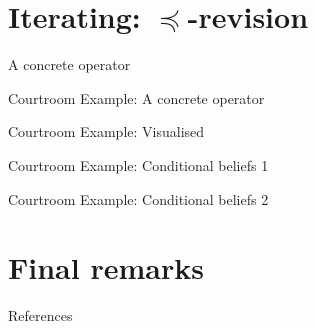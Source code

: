 \documentclass[11pt]{beamer}
\begin{document}
\section{Iterating: $\preceq$-revision}

\begin{frame}{A concrete operator}
\end{frame}

\begin{frame}{Courtroom Example: A concrete operator}
\end{frame}

\begin{frame}{Courtroom Example: Visualised}
\end{frame}

\begin{frame}{Courtroom Example: Conditional beliefs 1}
\end{frame}

\begin{frame}{Courtroom Example: Conditional beliefs 2}
\end{frame}

\section{Final remarks}

\begin{frame}{References}
    \typeout{}
    
    
\end{frame}
\end{document}

